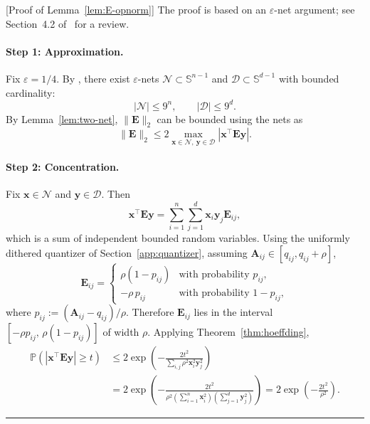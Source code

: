 \documentclass{article}
\newcommand{\twonorm}[1]{\|#1\|_2}
\newcommand{\pr}[1]{\mbox{}\mathbb{P}\left(#1\right)}
\newcommand{\xb}{\mathbf{x}}
\newcommand{\yb}{\mathbf{y}}
\newcommand{\Ab}{\mathbf{A}}
\newcommand{\Eb}{\mathbf{E}}
\newcommand{\Dcal}{\mathcal{D}}
\newcommand{\Ncal}{\mathcal{N}}
\newcommand{\BlackBox}{\rule{1.5ex}{1.5ex}}  %
\newenvironment{proof}{\par\noindent{\bf Proof\ }}{\hfill\BlackBox\par\medskip}
\newcommand{\rbr}[1]{\left(#1\right)}
\newcommand{\abr}[1]{\left|#1\right|}
\begin{document}
\begin{proof}[Proof of Lemma~\ref{lem:E-opnorm}]
The proof is based on an $\varepsilon$-net argument; see Section~4.2 of~\citet{Vershynin_2026} for a review.

\paragraph{Step 1: Approximation.}
Fix $\varepsilon = 1/4$. By \citep[Corollary~4.2.11]{Vershynin_2026}, there exist $\varepsilon$-nets $\Ncal \subset \mathbb{S}^{n-1}$ and $\Dcal \subset \mathbb{S}^{d-1}$ with bounded cardinality:
\begin{equation*}
    \abr{\Ncal} \le 9^n, \qquad \abr{\Dcal} \le 9^d.
\end{equation*}
By Lemma~\ref{lem:two-net}, $\twonorm{\Eb}$ can be bounded using the nets as
\begin{equation}\label{eq:E-net-relaxation}
    \twonorm{\Eb} \le 2 \max_{\xb\in\mathcal N,\ \yb\in\mathcal D}
    |\xb^\top \Eb \yb|.
\end{equation}

\paragraph{Step 2: Concentration.}
Fix $\xb \in \Ncal$ and $\yb \in \Dcal$. Then
\[
    \xb^\top \Eb \yb
    =
    \sum_{i=1}^{n}\sum_{j=1}^{d}
    \xb_i\yb_j\Eb_{ij},
\]
which is a sum of independent bounded random variables. Using the uniformly dithered quantizer of Section~\ref{app:quantizer}, assuming $\Ab_{ij}\in [q_{ij}, q_{ij}+\rho]$,
\begin{equation*}
    \Eb_{ij} = \begin{cases}
        \rho(1 - p_{ij}) & \text{with probability } p_{ij},\\
        -\rho\,p_{ij} & \text{with probability } 1 - p_{ij},
    \end{cases}
\end{equation*}
where $p_{ij}:=(\Ab_{ij}-q_{ij})/\rho$. Therefore $\Eb_{ij}$ lies in the interval $[-\rho p_{ij},\,\rho(1-p_{ij})]$ of width $\rho$. Applying Theorem~\ref{thm:hoeffding},
\begin{align*}
    \pr{\abr{\xb^\top \Eb \yb} \ge t}
    &\le 2\exp\rbr{-\frac{2 t^2}{\sum_{i,j}\rho^2 \xb_i^2 \yb_j^2}}\\
    &= 2\exp\rbr{-\frac{2 t^2}{\rho^2 \rbr{\sum_{i=1}^{n}\xb_i^2}\rbr{\sum_{j=1}^{d}\yb_j^2}}}
    = 2\exp\rbr{-\frac{2 t^2}{\rho^2}}.
\end{align*}


\end{proof}
\end{document}
